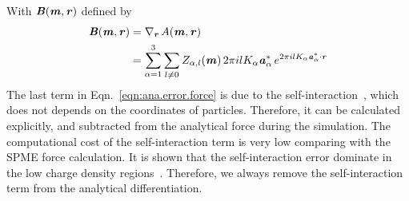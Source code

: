 \documentclass[aps,pre,preprint]{revtex4}
\renewcommand{\v}[1]{\textbf{\textit{#1}}}
\begin{document}
With $\v B(\v m, \v r)$ defined by
\begin{align}\nonumber
  \v B(\v m, \v r)
  &=
  \nabla_{\v r}\,A(\v m, \v r)\\\label{eqn:error-B}
  &=
  \sum_{\alpha=1}^3\sum_{l\neq 0}
  Z_{\alpha,l}(\v m)\,
  2\pi i l K_\alpha\v a_\alpha^\ast\,e^{2\pi i l K_\alpha\v a^\ast_\alpha\cdot \v r} 
\end{align}
The last term in Eqn.~\eqref{eqn:ana.error.force} is due to the
self-interaction~\cite{cerutti2009staggered, ballenegger2011removal,
  neelov2010interlaced}, which does not depends on the coordinates of
particles. Therefore, it can be calculated explicitly, and subtracted
from the analytical force during the simulation. The computational cost of
the self-interaction term is very low comparing with the SPME
force calculation. It is shown that the self-interaction  error
dominate in the low charge density regions~\cite{cerutti2009staggered}.
Therefore, we always remove the self-interaction term from
the analytical differentiation.
\end{document}
